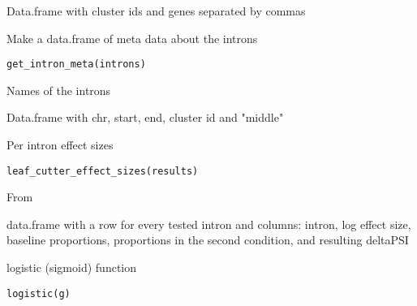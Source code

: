 \documentclass[a4paper]{book}
\begin{document}
%
\begin{Value}
Data.frame with cluster ids and genes separated by commas
\end{Value}
%
\begin{Description}\relax
Make a data.frame of meta data about the introns
\end{Description}
%
\begin{Usage}
\begin{verbatim}
get_intron_meta(introns)
\end{verbatim}
\end{Usage}
%
\begin{Arguments}
\begin{ldescription}
\item[\code{introns}] Names of the introns
\end{ldescription}
\end{Arguments}
%
\begin{Value}
Data.frame with chr, start, end, cluster id and "middle"
\end{Value}
%
\begin{Description}\relax
Per intron effect sizes
\end{Description}
%
\begin{Usage}
\begin{verbatim}
leaf_cutter_effect_sizes(results)
\end{verbatim}
\end{Usage}
%
\begin{Arguments}
\begin{ldescription}
\item[\code{results}] From 
\end{ldescription}
\end{Arguments}
%
\begin{Value}
data.frame with a row for every tested intron and columns: intron, log effect size, baseline proportions, proportions in the second condition, and resulting deltaPSI
\end{Value}
%
\begin{Description}\relax
logistic (sigmoid) function
\end{Description}
%
\begin{Usage}
\begin{verbatim}
logistic(g)
\end{verbatim}
\end{Usage}
\end{document}
